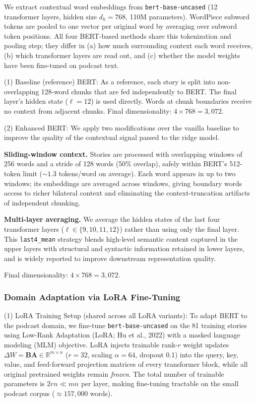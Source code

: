 We extract contextual word embeddings from \texttt{bert-base-uncased} (12
transformer layers, hidden size $d_h = 768$, 110M parameters).  WordPiece
subword tokens are pooled to one vector per original word by averaging over
subword token positions.  All four BERT-based methods share this tokenization
and pooling step; they differ in (a) how much surrounding context each word
receives, (b) which transformer layers are read out, and (c) whether the
model weights have been fine-tuned on podcast text.


(1) Baseline (reference) BERT: As a reference, each story is split into non-overlapping 128-word chunks that
are fed independently to BERT.  The final layer's hidden state
($\ell = 12$) is used directly.  Words at chunk boundaries receive no context
from adjacent chunks.  Final dimensionality: $4 \times 768 = 3{,}072$.



(2) Enhanced BERT: We apply two modifications over the vanilla baseline to improve the quality of
the contextual signal passed to the ridge model.

\textbf{Sliding-window context.}
Stories are processed with overlapping windows of 256 words and a stride of 128
words (50\% overlap), safely within BERT's 512-token limit
(${\sim}1.3$ tokens/word on average).  Each word appears in up to two windows;
its embeddings are averaged across windows, giving boundary words access to
richer bilateral context and eliminating the context-truncation artifacts of
independent chunking.

\textbf{Multi-layer averaging.}
We average the hidden states of the last four transformer layers
($\ell \in \{9,10,11,12\}$) rather than using only the final layer.  This
\texttt{last4\_mean} strategy blends high-level semantic content captured in the
upper layers with structural and syntactic information retained in lower layers,
and is widely reported to improve downstream representation quality.

Final dimensionality: $4 \times 768 = 3{,}072$.

\subsubsection{Domain Adaptation via LoRA Fine-Tuning}
\label{sec:lora}



(1) LoRA Training Setup (shared across all LoRA variants): To adapt BERT to the podcast domain, we fine-tune \texttt{bert-base-uncased} on
the 81 training stories using Low-Rank Adaptation (LoRA; Hu et al., 2022) with
a masked language modeling (MLM) objective.  LoRA injects trainable rank-$r$
weight updates
$\Delta W = \bm{B}\bm{A} \in \mathbb{R}^{m \times n}$
($r = 32$, scaling $\alpha = 64$, dropout 0.1) into the query, key, value, and
feed-forward projection matrices of every transformer block, while all original
pretrained weights remain \emph{frozen}.  The total number of trainable
parameters is $2rn \ll mn$ per layer, making fine-tuning tractable on the small
podcast corpus (${\approx}157{,}000$ words).

